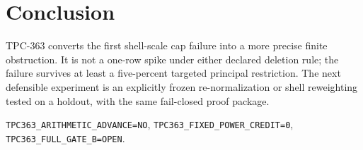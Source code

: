 \documentclass[10pt]{article}
\begin{document}
\section{Conclusion}

TPC-363 converts the first shell-scale cap failure into a more precise finite
obstruction.  It is not a one-row spike under either declared deletion rule;
the failure survives at least a five-percent targeted principal restriction.
The next defensible experiment is an explicitly frozen re-normalization or
shell reweighting tested on a holdout, with the same fail-closed proof package.

\begin{center}\small
\texttt{TPC363\_ARITHMETIC\_ADVANCE=NO},\quad
\texttt{TPC363\_FIXED\_POWER\_CREDIT=0},\quad
\texttt{TPC363\_FULL\_GATE\_B=OPEN}.
\end{center}
\end{document}
